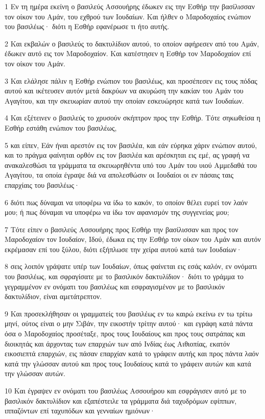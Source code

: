 \par 1 Εν τη ημέρα εκείνη ο βασιλεύς Ασσουήρης έδωκεν εις την Εσθήρ την βασίλισσαν τον οίκον του Αμάν, του εχθρού των Ιουδαίων. Και ήλθεν ο Μαροδοχαίος ενώπιον του βασιλέως· διότι η Εσθήρ εφανέρωσε τι ήτο αυτής.
\par 2 Και εκβαλών ο βασιλεύς το δακτυλίδιον αυτού, το οποίον αφήρεσεν από του Αμάν, έδωκεν αυτό εις τον Μαροδοχαίον. Και κατέστησεν η Εσθήρ τον Μαροδοχαίον επί τον οίκον του Αμάν.
\par 3 Και ελάλησε πάλιν η Εσθήρ ενώπιον του βασιλέως, και προσέπεσεν εις τους πόδας αυτού και ικέτευσεν αυτόν μετά δακρύων να ακυρώση την κακίαν του Αμάν του Αγαγίτου, και την σκευωρίαν αυτού την οποίαν εσκευώρησε κατά των Ιουδαίων.
\par 4 Και εξέτεινεν ο βασιλεύς το χρυσούν σκήπτρον προς την Εσθήρ. Τότε σηκωθείσα η Εσθήρ εστάθη ενώπιον του βασιλέως,
\par 5 και είπεν, Εάν ήναι αρεστόν εις τον βασιλέα, και εάν εύρηκα χάριν ενώπιον αυτού, και το πράγμα φαίνηται ορθόν εις τον βασιλέα και αρέσκηται εις εμέ, ας γραφή να ανακαλεσθώσι τα γράμματα τα σκευωρηθέντα υπό του Αμάν του υιού Αμμεδαθά του Αγαγίτου, τα οποία έγραψε διά να απολεσθώσιν οι Ιουδαίοι οι εν πάσαις ταις επαρχίαις του βασιλέως·
\par 6 διότι πως δύναμαι να υποφέρω να ίδω το κακόν, το οποίον θέλει ευρεί τον λαόν μου; ή πως δύναμαι να υποφέρω να ίδω τον αφανισμόν της συγγενείας μου;
\par 7 Τότε είπεν ο βασιλεύς Ασσουήρης προς Εσθήρ την βασίλισσαν και προς τον Μαροδοχαίον τον Ιουδαίον, Ιδού, έδωκα εις την Εσθήρ τον οίκον του Αμάν και αυτόν εκρέμασαν επί του ξύλου, διότι εξήπλωσε την χείρα αυτού κατά των Ιουδαίων·
\par 8 σεις λοιπόν γράψατε υπέρ των Ιουδαίων, όπως φαίνεται εις εσάς καλόν, εν ονόματι του βασιλέως, και σφραγίσατε με το βασιλικόν δακτυλίδιον· διότι το γράμμα το γεγραμμένον εν ονόματι του βασιλέως και εσφραγισμένον με το βασιλικόν δακτυλίδιον, είναι αμετάτρεπτον.
\par 9 Και προσεκλήθησαν οι γραμματείς του βασιλέως εν τω καιρώ εκείνω εν τω τρίτω μηνί, ούτος είναι ο μην Σιβάν, την εικοστήν τρίτην αυτού· και εγράφη κατά πάντα όσα ο Μαροδοχαίος προσέταξε, προς τους Ιουδαίους και προς τους σατράπας και διοικητάς και άρχοντας των επαρχιών των από Ινδίας έως Αιθιοπίας, εκατόν εικοσιεπτά επαρχιών, εις πάσαν επαρχίαν κατά το γράφειν αυτής και προς πάντα λαόν κατά την γλώσσαν αυτού και προς τους Ιουδαίους κατά το γράφειν αυτών και κατά την γλώσσαν αυτών.
\par 10 Και έγραψεν εν ονόματι του βασιλέως Ασσουήρου και εσφράγισεν αυτό με το βασιλικόν δακτυλίδιον και εξαπέστειλε τα γράμματα διά ταχυδρόμων εφίππων, ιππαζόντων επί ταχυπόδων και γενναίων ημιόνων·
